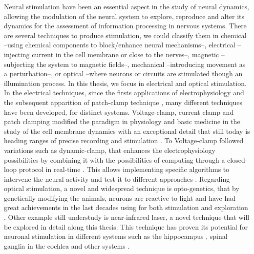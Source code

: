Neural stimulation have been an essential aspect in the study of neural dynamics, allowing the modulation of the neural system to explore, reproduce and alter its dynamics for the assessment of information processing in nervous systems. There are several techniques to produce  stimulation, we could classify them in chemical --using chemical components to block/enhance neural mechanisms--, electrical --injecting current in the cell membrane or close to the nerves--, magnetic --subjecting the system to magnetic fields--, mechanical --introducing movement as a perturbation--,  or optical --where neurons or circuits are stimulated though an illumination process. In this thesis, we focus in electrical and optical stimulation. In the electrical techniques, since the firsts applications of electrophysiology  \parencite{marmont_studies_1949,cole_ions_1955,neher_singlechannel_1976} and the subsequent apparition of patch-clamp technique \parencite{hamill_improved_1981}, many different techniques have been developed, for distinct systems. Voltage-clamp, current clamp and patch clamping modified the paradigm in physiology and basic medicine in the study of the cell membrane dynamics with an exceptional detail that still today is heading ranges of precise recording and stimulation \parencite{hamill_improved_1981}. To Voltage-clamp followed variations such as dynamic-clamp, that enhances the electrophysiology possibilities by combining it with the possibilities of computing through a closed-loop protocol in real-time \parencite{nowotny_dynamic_2022}. This allows implementing specific algorithms to intervene the neural activity and test it to different approaches \parencite{chamorro_generalization_2012}. 
Regarding optical stimulation, a novel and widespread technique is opto-genetics, that by genetically modifying the animals, neurons are reactive to light and have had great achievements in the last decades using for both stimulation and exploration \parencite{chen_roles_2022}. Other example still understudy is near-infrared laser, a novel technique that will be explored in detail along this thesis. This technique has proven its potential for neuronal stimulation in different systems such as the hippocampus \parencite{liang_temperaturedependent_2009}, spinal ganglia in the cochlea \parencite{goyal_acute_2012, barrett_pulsed_2018, brown_thermal_2020} and other systems \parencite{shapiro_infrared_2012, cayce_infrared_2014, begeng_activity_2022}.

%


